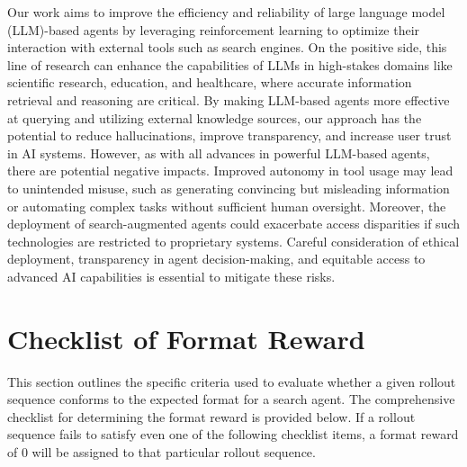 Our work aims to improve the efficiency and reliability of large language model (LLM)-based agents by leveraging reinforcement learning to optimize their interaction with external tools such as search engines. 
On the positive side, this line of research can enhance the capabilities of LLMs in high-stakes domains like scientific research, education, and healthcare, where accurate information retrieval and reasoning are critical. 
By making LLM-based agents more effective at querying and utilizing external knowledge sources, our approach has the potential to reduce hallucinations, improve transparency, and increase user trust in AI systems.
However, as with all advances in powerful LLM-based agents, there are potential negative impacts. 
Improved autonomy in tool usage may lead to unintended misuse, such as generating convincing but misleading information or automating complex tasks without sufficient human oversight.
Moreover, the deployment of search-augmented agents could exacerbate access disparities if such technologies are restricted to proprietary systems.
Careful consideration of ethical deployment, transparency in agent decision-making, and equitable access to advanced AI capabilities is essential to mitigate these risks.

\iffalse

\section{Checklist of Format Reward}\label{apx:sec:format}
This section outlines the specific criteria used to evaluate whether a given rollout sequence conforms to the expected format for a search agent. 
The comprehensive checklist for determining the format reward is provided below. 
If a rollout sequence fails to satisfy even one of the following checklist items, a format reward of 0 will be assigned to that particular rollout sequence.

